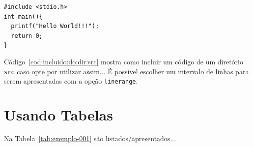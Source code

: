 \begin{lstlisting}[style=C, label=cod:hello:world, caption={Hello World Estilizado}]
#include <stdio.h>
int main(){
  printf("Hello World!!!");
  return 0;
}
\end{lstlisting}

Código~\ref{cod:incluido:do:dir:src} mostra como incluir um código de um diretório \texttt{src} caso opte por utilizar assim... É possível escolher um intervalo de linhas para serem apresentadas com a opção \texttt{linerange}.




\section{Usando Tabelas}
\label{cap:conceitos:sec:usando:tabelas}

Na Tabela~\ref{tab:exemplo-001} são listados/apresentados...

